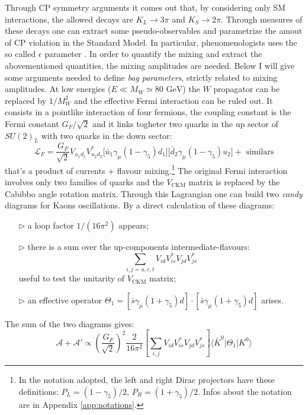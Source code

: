 \documentclass[english, LaM, oneside, noexaminfo]{sapthesis}
\newcommand{\la}{\langle}
\newcommand{\ra}{\rangle}
\newcommand{\gev}{\text{ GeV}}
\begin{document}
Through CP symmetry arguments it comes out that, by considering only SM interactions, the allowed decays are $K_L \rightarrow 3\pi$ and $K_S \rightarrow 2\pi$.
Through measures of these decays one can extract some pseudo-observables and parametrize the amout of CP violation in the Standard Model.
In particular, phenomenologists uses the so called $\epsilon$ parameter \cite{Donoghue}.
In order to quantify the mixing and extract the abovementioned quantities, the mixing amplitudes are needed.
Below I will give some arguments needed to define {\it bag parameters}, strictly related to mixing amplitudes.
\newline
At low energies ($E \ll M_W \simeq 80 \gev$) the $W$ propagator can be replaced by $1/M_W^2$ and the effective Fermi interaction can be ruled out.
It consists in a pointlike interaction of four fermions, the coupling constant is the Fermi constant $G_F/\sqrt{2}$ and it links togheter two quarks in the up sector of $SU(2)_L$ with two quarks in the down sector:
\begin{equation}\label{eq:Fermi-interaction}
    \mathcal{L}_F = \frac{G_F}{\sqrt{2}} V_{u_1 d_1} V_{u_2 d_2}^* \Big[\bar u_1 \gamma_\mu (1-\gamma_5)d_1\Big] \Big[\bar d_2 \gamma_\mu (1-\gamma_5)u_2\Big] + \text{ similars}
\end{equation}
that's a product of currents + flavour mixing.\footnote{In the notation adopted, the left and right Dirac projectors have these definitions: $P_L = (1-\gamma_5)/2$, $P_R = (1+\gamma_5)/2$. Infos about the notation are in Appendix \ref{app:notations}.} 
The original Fermi interaction involves only two families of quarks and the $V_{\text{CKM}}$ matrix is replaced by the Cabibbo angle rotation matrix.
Through this Lagrangian one can build two \textit{candy} diagrams for Kaons oscillations.
By a direct calculation of these diagrams:
\begin{itemize}
    \item [$\triangleright$] a loop factor $1/(16\pi^2)$ appears;
    \item [$\triangleright$] there is a sum over the up-components intermediate-flavours: $$\sum_{i,j=u,c,t} V_{id} V_{is}^* V_{jd} V_{js}^*$$ useful to test the unitarity of $V_\text{CKM}$ matrix;
    \item [$\triangleright$] an effective operator $\Theta_1 = \left[\bar s \gamma_\mu (1+\gamma_5) d\right] \cdot \left[ \bar s \gamma_\mu (1+\gamma_5) d \right]$ arises.
\end{itemize}
The sum of the two diagrams gives:
\begin{equation*}
    \mathcal{A} + \mathcal{A}' \propto \left(\frac{G_F}{\sqrt{2}}\right)^2 \frac{2}{16\pi^2} \left[\sum_{i,j} V_{id} V_{is}^* V_{jd} V_{js}^*\right] \la \bar K^0 | \Theta_1 | K^0 \ra
\end{equation*}
\end{document}
